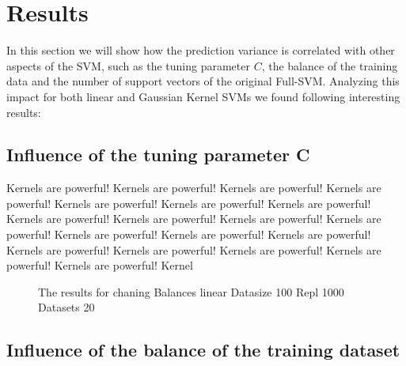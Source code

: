 \documentclass[letterpaper]{article}
\begin{document}
\section{Results}

In this section we will show how the prediction variance is correlated with other aspects of the SVM, such as the tuning parameter $C$, the balance of the training data and the number of support vectors of the original Full-SVM. Analyzing this impact for both linear and Gaussian Kernel SVMs we found following interesting results:


\subsection{Influence of the tuning parameter C}
Kernels are powerful! Kernels are powerful! Kernels are powerful! Kernels are powerful! Kernels are powerful! Kernels are powerful! Kernels are powerful! Kernels are powerful! Kernels are powerful! Kernels are powerful! Kernels are powerful! Kernels are powerful! Kernels are powerful! Kernels are powerful! Kernels are powerful! Kernels are powerful! Kernels are powerful! Kernels are powerful! Kernels are powerful! Kernel
 

\begin{figure}[!htb]
\begin{center}

\caption{The results for chaning Balances linear Datasize 100 Repl 1000 Datasets 20}
\label{fig1}
\end{center}
\end{figure}


\subsection{Influence of the balance of the training dataset}
\end{document}
